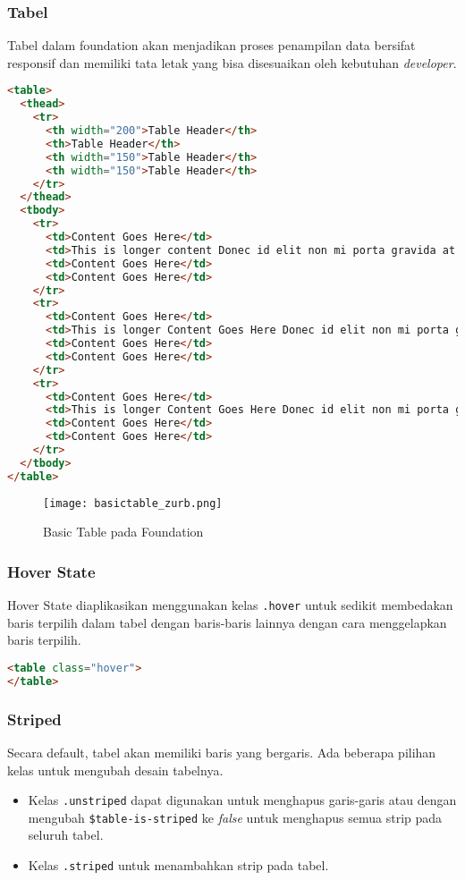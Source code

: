 \begin{itemize}
\subsubsection{Tabel}

Tabel dalam foundation akan menjadikan proses penampilan data bersifat responsif dan memiliki tata letak yang bisa disesuaikan oleh kebutuhan \textit{developer}.


\begin{lstlisting}[language=HTML, frame=single, basicstyle=\small]  
<table>
  <thead>
    <tr>
      <th width="200">Table Header</th>
      <th>Table Header</th>
      <th width="150">Table Header</th>
      <th width="150">Table Header</th>
    </tr>
  </thead>
  <tbody>
    <tr>
      <td>Content Goes Here</td>
      <td>This is longer content Donec id elit non mi porta gravida at eget metus.</td>
      <td>Content Goes Here</td>
      <td>Content Goes Here</td>
    </tr>
    <tr>
      <td>Content Goes Here</td>
      <td>This is longer Content Goes Here Donec id elit non mi porta gravida at eget metus.</td>
      <td>Content Goes Here</td>
      <td>Content Goes Here</td>
    </tr>
    <tr>
      <td>Content Goes Here</td>
      <td>This is longer Content Goes Here Donec id elit non mi porta gravida at eget metus.</td>
      <td>Content Goes Here</td>
      <td>Content Goes Here</td>
    </tr>
  </tbody>
</table>
\end{lstlisting}

\begin{figure} [H]
	\centering  
	\texttt{[image: basictable\_zurb.png]}  
	\caption{Basic Table pada Foundation}
\end{figure}

\subsubsection{Hover State}
Hover State diaplikasikan menggunakan kelas \texttt{.hover} untuk sedikit membedakan baris terpilih dalam tabel dengan baris-baris lainnya dengan cara menggelapkan baris terpilih.
\begin{lstlisting}[language=HTML, frame=single, basicstyle=\small] 
<table class="hover">
</table>
\end{lstlisting}

\subsubsection{Striped}
Secara default, tabel akan memiliki baris yang bergaris. 
Ada beberapa pilihan kelas untuk mengubah desain tabelnya.
\begin{itemize}
	\item Kelas \texttt{.unstriped} dapat digunakan untuk menghapus garis-garis atau dengan mengubah \verb|$table-is-striped| ke \textit{false} untuk menghapus semua strip pada seluruh tabel.
	\item Kelas \texttt{.striped} untuk menambahkan strip pada tabel.	
\end{itemize}


\end{itemize}
